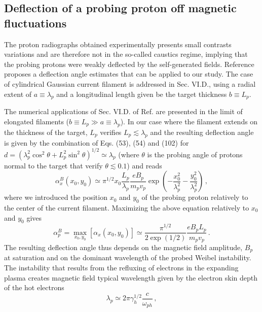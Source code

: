 \documentclass[aps,showpacs,superscriptaddress]{revtex4}
\begin{document}
\subsection{Deflection of a probing proton off magnetic fluctuations}
The proton radiographs obtained experimentally presents small contrasts variations and are therefore not in the so-called caustics regime, implying that the probing protons were weakly deflected by the self-generated fields.
Reference \cite[]{RSI_protograhyb} proposes a  deflection angle estimates that can be applied to our study.
The case of cylindrical Gaussian current filament is addressed in Sec. VI.D., using a radial extent of $a\equiv\lambda_p$ and a longitudinal length given be the target thickness $b\equiv L_p$.

The numerical applications of  Sec. VI.D. of Ref. \cite[]{RSI_protograhyb} are presented in the limit of   elongated filaments ($b\equiv L_p\gg a\equiv\lambda_p $). In our case where the filament  extends on the thickness of the target, $L_p$  verifies $ L_p \lesssim \lambda_p$ and the resulting deflection angle is given by the combination of Eqs. (53), (54) and (102) for $d = ( \lambda_p^2\cos^2\theta + L_p^2 \sin^2 \theta)^{1/2} \simeq  \lambda_p$ (where $\theta$ is the probing angle of protons normal to the target that verify $\theta\lesssim 0.1$) and reads
\begin{equation}\label{eq:alphaphith}
\alpha^B_x(x_0,y_0) \simeq \pi^{1/2} x_0 \frac{L_p }{\lambda_p}  \frac{e B_p }{m_p v_p} \exp\left(-\frac{x_0^2}{\lambda_p^2}-\frac{y_0^2}{ \lambda_p^2} \right)\, ,
\end{equation}
where we introduced the position $x_0$ and $y_0$ of the probing proton relatively to the center of the current filament.
Maximizing the above equation relatively to $x_0$ and $y_0$ gives
\begin{equation}
\alpha^B_p = \max_{x_0,y_0}[\alpha_x(x_0,y_0) ] \simeq \frac{\pi^{1/2}}{2\exp(1/2)} \frac{e  B_p L_p }{m_p v_p}\, . \label{eq:alaphaphi}
\end{equation}
The resulting deflection angle thus depends on the magnetic field amplitude,  $  B_p$ at saturation and on the dominant wavelength of the probed Weibel instability.
The instability that results from the refluxing of electrons in the expanding plasma creates magnetic field typical wavelength \cite[]{PRL_Gode_2017} given by the electron skin depth of the hot electrons 
\begin{equation}\label{eq:lp}
\lambda_p \simeq 2\pi\gamma_h^{1/2} \frac{c}{\omega_{ph}} \, ,
\end{equation}
\end{document}
